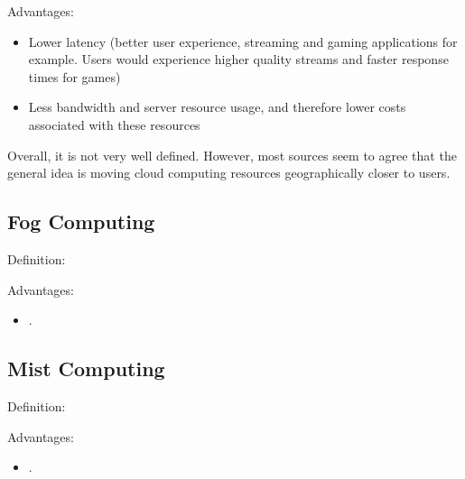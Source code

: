 Advantages:
\begin{itemize}
  \item Lower latency (better user experience, streaming and gaming applications
    for example. Users would experience higher quality streams and faster
    response times for games)
  \item Less bandwidth and server resource usage, and therefore lower costs
    associated with these resources
\end{itemize}

Overall, it is not very well defined. However, most sources seem to agree that
the general idea is moving cloud computing resources geographically closer to
users.

\subsection{Fog Computing}
Definition: 


Advantages:
\begin{itemize}
  \item .
\end{itemize}

\subsection{Mist Computing}
Definition: 

Advantages:
\begin{itemize}
  \item .
\end{itemize}

